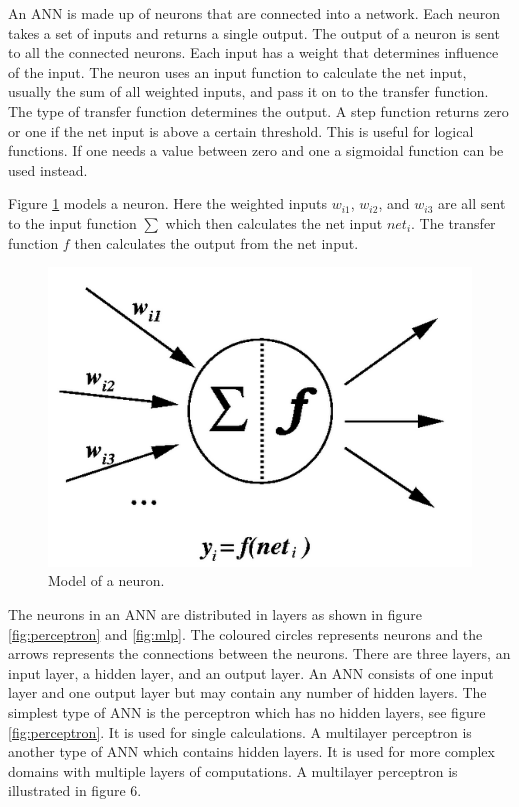 An ANN is made up of neurons that are connected into a network. Each neuron takes a set of inputs and returns a single output. The output of a neuron is sent to all the connected neurons. Each input has a weight that determines influence of the input. The neuron uses an input function to calculate the net input, usually the sum of all weighted inputs, and pass it on to the transfer function. The type of transfer function determines the output. A step function returns zero or one if the net input is above a certain threshold. This is useful for logical functions. If one needs a value between zero and one a sigmoidal function can be used instead.

Figure \ref{fig:neuron} models a neuron. Here the weighted inputs $w_{i1}$, $w_{i2}$, and $w_{i3}$ are all sent to the input function $\sum$ which then calculates the net input $net_{i}$. The transfer function $f$ then calculates the output from the net input.

\begin{figure}[H]
  \center
    \includegraphics[scale=0.4]{images/nn/neuron.png}
  \caption{Model of a neuron.\cite{neuron} \label{fig:neuron}}
\end{figure}

The neurons in an ANN are distributed in layers as shown in figure \ref{fig:perceptron} and \ref{fig:mlp}. The coloured circles represents neurons and the arrows represents the connections between the neurons. There are three layers, an input layer, a hidden layer, and an output layer. An ANN consists of one input layer and one output layer but may contain any number of hidden layers. The simplest type of ANN is the perceptron which has no hidden layers, see figure \ref{fig:perceptron}. It is used for single calculations. A multilayer perceptron is another type of ANN which contains hidden layers. It is used for more complex domains with multiple layers of computations. A multilayer perceptron is illustrated in figure 6.

